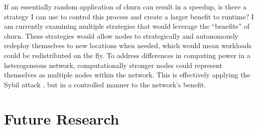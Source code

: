 \documentclass[letterpaper]{article}
\begin{document}
If an essentially random application of churn can result in a speedup, is there a strategy I can use to control this process and create a larger benefit to runtime?
I am currently examining multiple strategies that would leverage the ``benefits'' of churn.
These strategies would allow nodes to strategically and autonomously redeploy themselves to new locations when needed, which would mean workloads could be redistributed on the fly.
To address differences in computing power in a heterogeneous network, computationally stronger nodes could represent themselves as multiple nodes within the network.
This is effectively applying the Sybil attack \cite{sybil}, but in a controlled manner to the network's benefit.




%
%
%
%
%


\section{Future Research}





\end{document}
